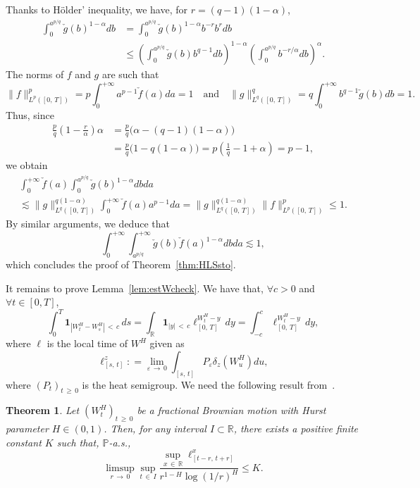 \documentclass[10pt]{amsart}
\newtheorem{theo}{Theorem}[section]
\theoremstyle{definition}\newtheorem{defi}[theo]{Definition}\newtheorem{rema}[theo]{Remark}\newtheorem{exam}[theo]{Example}\newtheorem{exem}[theo]{Example}\newtheorem{nota}[theo]{Notation}
\newcommand{\bbP}{\mathbb{P}}
\newcommand{\bbR}{\mathbb{R}}
\newcommand{\bfun}{\mathbf{1}}
\let\oldforall\forall
\renewcommand*{\forall}{\mathrel{\oldforall}}
\begin{document}
Thanks to H\"older' inequality, we have, for $r = (q-1)(1-\alpha)$,
\begin{align*}
\int_0^{a^{p/q}}\check{g}(b)^{1-\alpha}db &= \int_0^{a^{p/q}}\check{g}(b)^{1-\alpha}b^{-r}b^{r}db
\\ &\leq \left(\int_0^{a^{p/q}}\check{g}(b) b^{q-1}db \right)^{1-\alpha}\left(\int_0^{a^{p/q}} b^{-r/\alpha}db\right)^{\alpha}.
\end{align*}
The norms of $f$ and $g$ are such that
\[
\|f\|_{L^p\left([0,\,T]\right)}^p = p\int_0^{+\infty} a^{p-1} \check{f}(a)da = 1\quad\text{and}\quad \|g\|_{L^q\left([0,\,T]\right)}^q = q\int_0^{+\infty} b^{q-1} \check{g}(b)db = 1.
\]
Thus, since
\begin{align*}
\frac pq\left(1-\frac{r}{\alpha}\right)\alpha &= \frac pq\big(\alpha - (q-1)\left(1-\alpha\right)\big)
\\ &=\frac pq\big(1 - q\left(1-\alpha\right)\big) = p\left(\frac1q - 1 + \alpha\right) = p - 1,
\end{align*}
we obtain
\begin{multline*}
\int_0^{+\infty}\check{f}(a)\int_0^{a^{p/q}}\check{g}(b)^{1-\alpha}db da\\ \lesssim \|g\|_{L^q\left([0,\,T]\right)}^{q(1-\alpha)}\int_{0}^{+\infty}\check{f}(a)a^{p-1}da = \|g\|_{L^q\left([0,\,T]\right)}^{q(1-\alpha)}\|f\|_{L^p\left([0,\,T]\right)}^p\leq 1.
\end{multline*}
By similar arguments, we deduce that
\[
\int_0^{+\infty}\int_{a^{p/q}}^{+\infty} \check{g}(b)\check{f}(a)^{1-\alpha} db da \lesssim 1,
\]
which concludes the proof of Theorem~\ref{thm:HLSsto}.


It remains to prove Lemma~\ref{lem:estWcheck}. We have that, $\forall c>0$ and $\forall t\in [0,T]$,
\[
\int_0^T \bfun_{\left|W_t^H-W_s^H\right|\,<\,c}\,ds = \int_{\bbR} \bfun_{|y|\,<\,c} \ell^{W_t^H-y}_{[0,\,T]}\,dy = \int_{-c}^{c} \ell^{W_t^H-y}_{[0,\,T]}\,dy,
\]
where $\ell$ is the local time of $W^H$ given as
\[
\ell^z_{[s,\,t]} : = \lim_{\varepsilon\,\to\,0}\int_{[s,\,t]} P_{\varepsilon} \delta_z\left(W^H_u\right)du,
\]
where $(P_{t})_{t\,\geq\,0}$ is the heat semigroup. We need the following result from~\cite{xiao1997holder}.

\begin{theo}\label{thm:LTHolder}
Let $(W^H_t)_{t\,\geq\,0}$ be a fractional Brownian motion with Hurst parameter $H\in(0,1)$. Then, for any interval $I\subset \bbR$, there exists a positive finite constant $K$ such that, $\bbP$-a.s.,
\[
\underset{r\,\to\,0}{\limsup} \sup_{t\,\in\,I} \frac{\sup_{x\,\in\,\bbR}\ell^x_{\left[t-r,\,t+r\right]}}{r^{1-H}\log(1/r)^H}\leq K.
\]
\end{theo}
\end{document}

